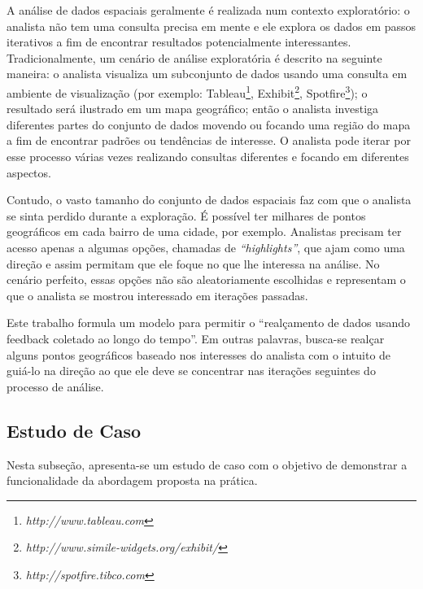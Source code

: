 A análise de dados espaciais geralmente é realizada num contexto exploratório: o analista não tem uma consulta precisa em mente e ele explora os dados em passos iterativos a fim de encontrar resultados potencialmente interessantes. Tradicionalmente, um cenário de análise exploratória é descrito na seguinte maneira: o analista visualiza um subconjunto de dados usando uma consulta em ambiente de visualização (por exemplo: Tableau\footnote{\em http://www.tableau.com},
Exhibit\footnote{\em http://www.simile-widgets.org/exhibit/},
Spotfire\footnote{\em http://spotfire.tibco.com}); o resultado será ilustrado em um mapa geográfico; então o analista investiga diferentes partes do conjunto de dados movendo ou focando uma região do mapa a fim de encontrar padrões ou tendências de interesse. O analista pode iterar por esse processo várias vezes realizando consultas diferentes e focando em diferentes aspectos.

Contudo, o vasto tamanho do conjunto de dados espaciais faz com que o analista se sinta perdido durante a exploração. É possível ter milhares de pontos geográficos em cada bairro de uma cidade, por exemplo. Analistas precisam ter acesso apenas a algumas opções, chamadas de {\em ``highlights''}, que ajam como uma direção e assim permitam que ele foque no que lhe interessa na análise. No cenário perfeito, essas opções não são aleatoriamente escolhidas e representam o que o analista se mostrou interessado em iterações passadas.

Este trabalho formula um modelo para permitir o ``realçamento de dados usando feedback coletado ao longo do tempo''. Em outras palavras, busca-se realçar alguns pontos geográficos baseado nos interesses do analista com o intuito de guiá-lo na direção ao que ele deve se concentrar nas iterações seguintes do processo de análise.

\subsection{Estudo de Caso}

Nesta subseção, apresenta-se um estudo de caso com o objetivo de demonstrar a funcionalidade da abordagem proposta na prática.

